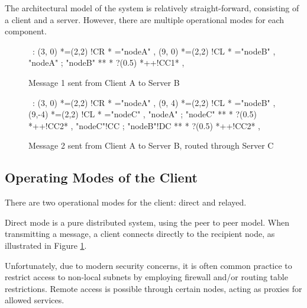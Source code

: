The architectural model of the system is relatively straight-forward,
consisting of a client and a server. However, there are multiple
operational modes for each component.

\begin{figure}[H]

\begin{center}
\ \xy<1cm,0cm>:
(3, 0) *=(2,2) !CR  *\frm{-} ="nodeA" , 
(9, 0) *=(2,2) !CL  *\frm{=} ="nodeB" , 
"nodeA" ; "nodeB" **\dir{-} *\dir{>} ?(0.5) *++!CC{1}* , 
\endxy
\end{center}

\label{fig:client}

\caption{Message 1 sent from Client A to Server B}

\end{figure}

\begin{figure}[H]

\begin{center}
\ \xy<1cm,0cm>:
(3, 0) *=(2,2) !CR  *\frm{-} ="nodeA" , 
(9, 4) *=(2,2) !CL  *\frm{=} ="nodeB" , 
(9,-4) *=(2,2) !CL  *\frm{=} ="nodeC" , 
"nodeA" ; "nodeC" **\dir{-} *\dir{>} ?(0.5) *++!CC{2}* , 
"nodeC"!CC ; "nodeB"!DC **\dir{-} *\dir{>} ?(0.5) *++!CC{2}* , 
\endxy
\end{center}

\caption{Message 2 sent from Client A to Server B, routed through Server C}

\label{fig:relay}

\end{figure}

\subsection{Operating Modes of the Client}

There are two operational modes for the client: direct and relayed.

Direct mode is a pure distributed system, using the peer to peer model.
When transmitting a message, a client connects directly to the
recipient node, as illustrated in Figure \ref{fig:client}.


Unfortunately, due to modern security concerns, it is often common 
practice to restrict access to non-local subnets by employing firewall
and/or routing table restrictions. Remote access is possible through
certain nodes, acting as proxies for allowed services. 


